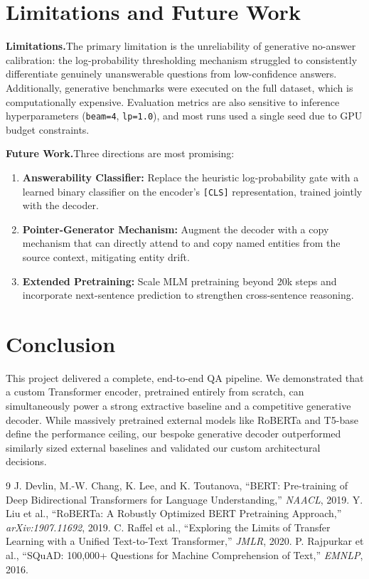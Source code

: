 \documentclass[10pt,twocolumn]{article}
\begin{document}
\section{Limitations and Future Work}

\textbf{Limitations.}\quad The primary limitation is the unreliability of generative no-answer calibration: the log-probability thresholding mechanism struggled to consistently differentiate genuinely unanswerable questions from low-confidence answers. Additionally, generative benchmarks were executed on the full dataset, which is computationally expensive. Evaluation metrics are also sensitive to inference hyperparameters (\texttt{beam=4}, \texttt{lp=1.0}), and most runs used a single seed due to GPU budget constraints.

\textbf{Future Work.}\quad Three directions are most promising:
\begin{enumerate}[leftmargin=1.2em,noitemsep,topsep=2pt]
\item \textbf{Answerability Classifier:} Replace the heuristic log-probability gate with a learned binary classifier on the encoder's \texttt{[CLS]} representation, trained jointly with the decoder.
\item \textbf{Pointer-Generator Mechanism:} Augment the decoder with a copy mechanism that can directly attend to and copy named entities from the source context, mitigating entity drift.
\item \textbf{Extended Pretraining:} Scale MLM pretraining beyond 20k steps and incorporate next-sentence prediction to strengthen cross-sentence reasoning.
\end{enumerate}

\section{Conclusion}
This project delivered a complete, end-to-end QA pipeline. We demonstrated that a custom Transformer encoder, pretrained entirely from scratch, can simultaneously power a strong extractive baseline and a competitive generative decoder. While massively pretrained external models like RoBERTa and T5-base define the performance ceiling, our bespoke generative decoder outperformed similarly sized external baselines and validated our custom architectural decisions.

\begin{thebibliography}{9}\small
{}
J. Devlin, M.-W. Chang, K. Lee, and K. Toutanova, ``BERT: Pre-training of Deep Bidirectional Transformers for Language Understanding,'' \textit{NAACL}, 2019.
Y. Liu et al., ``RoBERTa: A Robustly Optimized BERT Pretraining Approach,'' \textit{arXiv:1907.11692}, 2019.
C. Raffel et al., ``Exploring the Limits of Transfer Learning with a Unified Text-to-Text Transformer,'' \textit{JMLR}, 2020.
P. Rajpurkar et al., ``SQuAD: 100,000+ Questions for Machine Comprehension of Text,'' \textit{EMNLP}, 2016.
\end{thebibliography}
\end{document}
